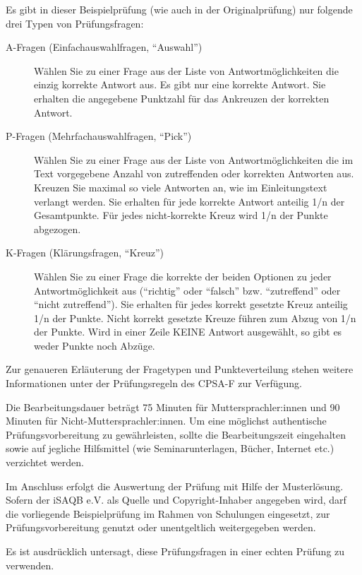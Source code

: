 \documentclass[12pt,a4paper]{article}
\begin{document}
Es gibt in dieser Beispielprüfung (wie auch in der Originalprüfung)
nur folgende drei Typen von Prüfungsfragen:

\begin{description}
\item[A-Fragen (Einfachauswahlfragen, "`Auswahl"')] Wählen Sie zu
  einer Frage aus der Liste von Antwortmöglichkeiten die einzig
  korrekte Antwort aus. Es gibt nur eine korrekte Antwort. Sie
  erhalten die angegebene Punktzahl für das Ankreuzen der korrekten
  Antwort.
\item[P-Fragen (Mehrfachauswahlfragen, "`Pick"')] Wählen Sie zu einer
  Frage aus der Liste von Antwortmöglichkeiten die im Text vorgegebene
  Anzahl von zutreffenden oder korrekten Antworten aus. Kreuzen Sie
  maximal so viele Antworten an, wie im Einleitungstext verlangt
  werden. Sie erhalten für jede korrekte Antwort anteilig 1/n der
  Gesamtpunkte. Für jedes nicht-korrekte Kreuz wird 1/n der Punkte
  abgezogen.
\item[K-Fragen (Klärungsfragen, "`Kreuz"')] Wählen Sie zu einer Frage
  die korrekte der beiden Optionen zu jeder Antwortmöglichkeit aus
  ("`richtig"' oder "`falsch"' bzw. "`zutreffend"' oder "`nicht
  zutreffend"'). Sie erhalten für jedes korrekt gesetzte Kreuz anteilig
  1/n der Punkte. Nicht korrekt gesetzte Kreuze führen zum Abzug von
  1/n der Punkte. Wird in einer Zeile KEINE Antwort ausgewählt, so
  gibt es weder Punkte noch Abzüge.
\end{description}
%
Zur genaueren Erläuterung der Fragetypen und Punkteverteilung stehen
weitere Informationen unter der Prüfungsregeln des CPSA-F zur
Verfügung.

Die Bearbeitungsdauer beträgt 75 Minuten für Muttersprachler:innen und 90
Minuten für Nicht-Muttersprachler:innen. Um eine möglichst authentische
Prüfungsvorbereitung zu gewährleisten, sollte die Bearbeitungszeit
eingehalten sowie auf jegliche Hilfsmittel (wie Seminarunterlagen,
Bücher, Internet etc.) verzichtet werden.

Im Anschluss erfolgt die Auswertung der Prüfung mit Hilfe der
Musterlösung. Sofern der iSAQB\registered{} e.V. als Quelle und
Copyright-Inhaber angegeben wird, darf die vorliegende Beispielprüfung
im Rahmen von Schulungen eingesetzt, zur Prüfungsvorbereitung genutzt
oder unentgeltlich weitergegeben werden.

Es ist ausdrücklich untersagt, diese Prüfungsfragen in einer echten
Prüfung zu verwenden.

\newpage

\setcounter{examQuestion}{1}

\end{document}

